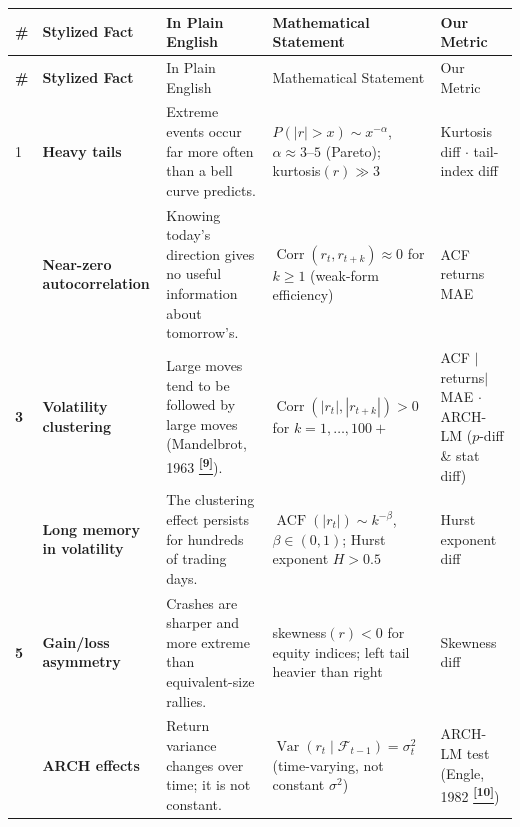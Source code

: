 \documentclass[10pt]{article}
\newcommand{\tcite}[1]{%
  \hyperlink{R:#1}{\textsuperscript{\scriptsize\textbf{[#1]}}}}
\begin{document}
\vspace{2pt}
\small
\setlength{\tabcolsep}{5pt}
\renewcommand{\arraystretch}{1.4}
\begin{longtable}{%
  >{\bfseries\centering}p{}
  >{\bfseries}p{}
  p{}
  p{}
  p{}}

\rowcolor{Navy}
{\color{white}\#} &
{\color{white}Stylized Fact} &
{\color{white}In Plain English} &
{\color{white}Mathematical Statement} &
{\color{white}Our Metric} \\[2pt]
\endfirsthead
\rowcolor{Navy}
{\color{white}\#} &
{\color{white}Stylized Fact} &
{\color{white}In Plain English} &
{\color{white}Mathematical Statement} &
{\color{white}Our Metric} \\[2pt]
\endhead

\rowcolor{TabOdd}
1 & Heavy tails &
  Extreme events occur far more often than a bell curve predicts. &
  $P(|r|>x) \sim x^{-\alpha}$, $\alpha \approx 3$--$5$ (Pareto); kurtosis$(r) \gg 3$ &
  Kurtosis diff $\cdot$ tail-index diff \\

2 & Near-zero autocorrelation &
  Knowing today's direction gives no useful information about tomorrow's. &
  $\operatorname{Corr}(r_t, r_{t+k}) \approx 0$ for $k \geq 1$ (weak-form efficiency) &
  ACF returns MAE \\

\rowcolor{TabOdd}
3 & Volatility clustering &
  Large moves tend to be followed by large moves (Mandelbrot, 1963\tcite{9}). &
  $\operatorname{Corr}(|r_t|, |r_{t+k}|) > 0$ for $k = 1, \ldots, 100{+}$ &
  ACF $|$returns$|$ MAE $\cdot$ ARCH-LM ($p$-diff \& stat diff) \\

4 & Long memory in volatility &
  The clustering effect persists for hundreds of trading days. &
  $\operatorname{ACF}(|r_t|) \sim k^{-\beta}$, $\beta \in (0,1)$; Hurst exponent $H > 0.5$ &
  Hurst exponent diff \\

\rowcolor{TabOdd}
5 & Gain/loss asymmetry &
  Crashes are sharper and more extreme than equivalent-size rallies. &
  skewness$(r) < 0$ for equity indices; left tail heavier than right &
  Skewness diff \\

6 & ARCH effects &
  Return variance changes over time; it is not constant. &
  $\operatorname{Var}(r_t \mid \mathcal{F}_{t-1}) = \sigma^2_t$ (time-varying, not constant $\sigma^2$) &
  ARCH-LM test (Engle, 1982\tcite{10}) \\


\end{longtable}
\end{document}
